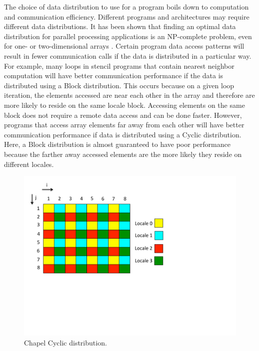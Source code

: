 The choice of data distribution to use for a program boils down to computation and communication efficiency. Different programs and architectures may require different data distributions. It has been shown that finding an optimal data distribution for parallel processing applications is an NP-complete problem, even for one- or two-dimensional arrays \cite{mace1987memory}. Certain program data access patterns will result in fewer communication calls if the data is distributed in a particular way. For example, many loops in stencil programs that contain nearest neighbor computation will have better communication performance if the data is distributed using a Block distribution. This occurs because on a given loop iteration, the elements accessed are near each other in the array and therefore are more likely to reside on the same locale block. Accessing elements on the same block does not require a remote data access and can be done faster. However, programs that access array elements far away from each other will have better communication performance if data is distributed using a Cyclic distribution. Here, a Block distribution is almost guaranteed to have poor performance because the farther away accessed elements are the more likely they reside on different locales. 

\begin{figure}
	\begin{center}
	\includegraphics[scale=0.55]{./Figures/cyc_dist}
	\caption{Chapel Cyclic distribution.}
	\label{cyc_dist}
	\end{center}
\end{figure}

